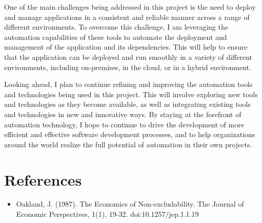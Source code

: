 \documentclass[
  10pt,
  paper=a4,
  ,captions=tableheading
]{scrartcl}
\providecommand{\tightlist}{%
  \setlength{\itemsep}{0pt}\setlength{\parskip}{0pt}}
\begin{document}
One of the main challenges being addressed in this project is the need
to deploy and manage applications in a consistent and reliable manner
across a range of different environments. To overcome this challenge, I
am leveraging the automation capabilities of these tools to automate the
deployment and management of the application and its dependencies. This
will help to ensure that the application can be deployed and run
smoothly in a variety of different environments, including on-premises,
in the cloud, or in a hybrid environment.

Looking ahead, I plan to continue refining and improving the automation
tools and technologies being used in this project. This will involve
exploring new tools and technologies as they become available, as well
as integrating existing tools and technologies in new and innovative
ways. By staying at the forefront of automation technology, I hope to
continue to drive the development of more efficient and effective
software development processes, and to help organizations around the
world realize the full potential of automation in their own projects.

\hypertarget{references}{%
\section{References}\label{references}}

\begin{itemize}
\tightlist
\item
  Oakland, J. (1987). The Economics of Non-excludability. The Journal of
  Economic Perspectives, 1(1), 19-32. doi:10.1257/jep.1.1.19
\end{itemize}
\end{document}

